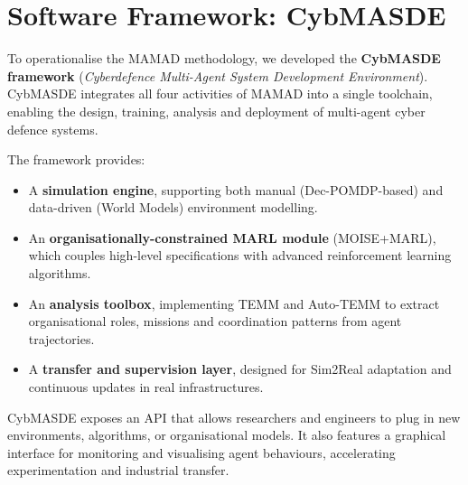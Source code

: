 \documentclass[a4paper,10pt,twocolumn]{article}
\begin{document}
\section{Software Framework: CybMASDE}

To operationalise the MAMAD methodology, we developed the
\textbf{CybMASDE framework} (\textit{Cyberdefence Multi-Agent System
    Development Environment}). CybMASDE integrates all four activities of
MAMAD into a single toolchain, enabling the design, training, analysis
and deployment of multi-agent cyber defence systems.

The framework provides:
\begin{itemize}
    \item A \textbf{simulation engine}, supporting both manual
          (Dec-POMDP-based) and data-driven (World Models) environment modelling.
    \item An \textbf{organisationally-constrained MARL module}
          (MOISE+MARL), which couples high-level specifications with advanced
          reinforcement learning algorithms.
    \item An \textbf{analysis toolbox}, implementing TEMM and Auto-TEMM
          to extract organisational roles, missions and coordination patterns
          from agent trajectories.
    \item A \textbf{transfer and supervision layer}, designed for Sim2Real
          adaptation and continuous updates in real infrastructures.
\end{itemize}

CybMASDE exposes an API that allows researchers and engineers to plug in
new environments, algorithms, or organisational models. It also features
a graphical interface for monitoring and visualising agent behaviours,
accelerating experimentation and industrial transfer.
\end{document}
